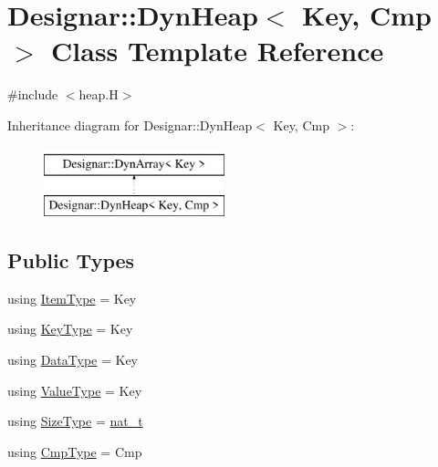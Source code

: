 \hypertarget{class_designar_1_1_dyn_heap}{}\section{Designar\+:\+:Dyn\+Heap$<$ Key, Cmp $>$ Class Template Reference}
\label{class_designar_1_1_dyn_heap}


{\ttfamily \#include $<$heap.\+H$>$}

Inheritance diagram for Designar\+:\+:Dyn\+Heap$<$ Key, Cmp $>$\+:\begin{figure}[H]
\begin{center}
\leavevmode
\includegraphics[height=2.000000cm]{class_designar_1_1_dyn_heap}
\end{center}
\end{figure}
\subsection*{Public Types}
\begin{DoxyCompactItemize}
\item 
using \hyperlink{class_designar_1_1_dyn_heap_a8b4add310e82b260912210069852febc}{Item\+Type} = Key
\item 
using \hyperlink{class_designar_1_1_dyn_heap_aa7260c4d35ad97e41f779bcf2b41808b}{Key\+Type} = Key
\item 
using \hyperlink{class_designar_1_1_dyn_heap_aa4011e735cd33c5043f59ae43a2ce318}{Data\+Type} = Key
\item 
using \hyperlink{class_designar_1_1_dyn_heap_a4c44d536a7ae76bbb7e667e1ea3b94ff}{Value\+Type} = Key
\item 
using \hyperlink{class_designar_1_1_dyn_heap_aa5d0813645a3a87407d2c95f0f4d5cad}{Size\+Type} = \hyperlink{namespace_designar_aa72662848b9f4815e7bf31a7cf3e33d1}{nat\+\_\+t}
\item 
using \hyperlink{class_designar_1_1_dyn_heap_af4eef9bc99b80f175c541cabff5333e0}{Cmp\+Type} = Cmp
\end{DoxyCompactItemize}
